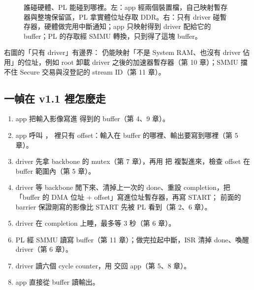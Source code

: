 \begin{figure}[h]
\caption{誰碰硬體、PL 能碰到哪裡。左：app 經兩個裝置檔，自己映射暫存器與整塊保留區，PL 拿實體位址存取 DDR。右：只有 driver 碰暫存器，硬體做完用中斷通知；app 只映射得到 driver 配給它的 buffer；PL 的存取經 SMMU 轉換，只到得了這塊 buffer。}
\label{fig:arch}
\end{figure}

右圖的「只有 driver」有邊界： 仍能映射「不是 System RAM、也沒有 driver 佔用」的位址，例如 root 卸載 driver 之後的加速器暫存器（第 10 章）；SMMU 擋不住 Secure 交易與沒登記的 stream ID（第 11 章）。

\subsection*{一幀在 v1.1 裡怎麼走}

\begin{enumerate}
\item app 把輸入影像寫進  得到的 buffer（第 4、9 章）。
\item app 呼叫 ， 裡只有 offset：輸入在 buffer 的哪裡、輸出要寫到哪裡（第 5 章）。
\item driver 先拿 backbone 的 mutex（第 7 章），再用  把  複製進來，檢查 offset 在 buffer 範圍內（第 5 章）。
\item driver 等 backbone 閒下來、清掉上一次的 done、重設 completion，把「buffer 的 DMA 位址 + offset」寫進位址暫存器，再寫 START； 前面的 barrier 保證剛寫的影像比 START 先被 PL 看到（第 2、6 章）。
\item driver 在 completion 上睡，最多等 3 秒（第 6 章）。
\item PL 經 SMMU 讀寫 buffer（第 11 章）；做完拉起中斷，ISR 清掉 done、喚醒 driver（第 6 章）。
\item driver 讀六個 cycle counter，用  交回 app（第 5、8 章）。
\item app 直接從 buffer 讀輸出。
\end{enumerate}

